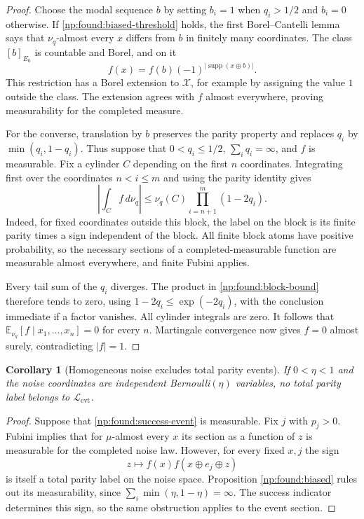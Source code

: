 \documentclass[11pt,a4paper]{article}
\newtheorem{corollary}[theorem]{Corollary}
\theoremstyle{definition}
\theoremstyle{remark}
\newcommand{\E}{\mathbb E}
\newcommand{\cX}{\mathcal X}
\begin{document}
\begin{proof}
Choose the modal sequence $b$ by setting $b_i=1$ when $q_i>1/2$ and
$b_i=0$ otherwise.  If \eqref{np:found:biased-threshold} holds, the first
Borel--Cantelli lemma says that $\nu_q$-almost every $x$ differs from $b$
in finitely many coordinates.  The class $[b]_{E_0}$ is countable and
Borel, and on it
\[
 f(x)=f(b)(-1)^{|\operatorname{supp}(x\oplus b)|}.
\]
This restriction has a Borel extension to $\cX$, for example by assigning
the value $1$ outside the class.  The extension agrees with $f$ almost
everywhere, proving measurability for the completed measure.

For the converse, translation by $b$ preserves the parity property and
replaces $q_i$ by $\min(q_i,1-q_i)$.  Thus suppose that
$0<q_i\le 1/2$, $\sum_i q_i=\infty$, and $f$ is measurable.  Fix a
cylinder $C$ depending on the first $n$ coordinates.  Integrating first
over the coordinates $n<i\le m$ and using the parity identity gives
\begin{equation}
 \left|\int_C f\,d\nu_q\right|
 \le \nu_q(C)\prod_{i=n+1}^{m}(1-2q_i).
 \label{np:found:block-bound}
\end{equation}
Indeed, for fixed coordinates outside this block, the label on the
block is its finite parity times a sign independent of the block.
All finite block atoms have positive probability, so the necessary
sections of a completed-measurable function are measurable almost
everywhere, and finite Fubini applies.

Every tail sum of the $q_i$ diverges.  The product in
\eqref{np:found:block-bound} therefore tends to zero, using
$1-2q_i\le \exp(-2q_i)$, with the conclusion immediate if a factor
vanishes.  All cylinder integrals are zero.  It follows that
$\E_{\nu_q}[f\mid x_1,\ldots,x_n]=0$ for every $n$.
Martingale convergence now gives $f=0$ almost surely, contradicting
$|f|=1$.
\end{proof}

\begin{corollary}[Homogeneous noise excludes total parity events]
\label{np:found:homogeneous-event}
If $0<\eta<1$ and the noise coordinates are independent
Bernoulli$(\eta)$ variables, no total parity label belongs to
$\mathcal L_{\mathrm{evt}}$.
\end{corollary}

\begin{proof}
Suppose that \eqref{np:found:success-event} is measurable.  Fix $j$ with
$p_j>0$.  Fubini implies that for $\mu$-almost every $x$ its section as
a function of $z$ is measurable for the completed noise law.  However,
for every fixed $x,j$ the sign
\[
 z\longmapsto f(x)f(x\oplus e_j\oplus z)
\]
is itself a total parity label on the noise space.  Proposition
\ref{np:found:biased} rules out its measurability, since
$\sum_i\min(\eta,1-\eta)=\infty$.  The success indicator determines
this sign, so the same obstruction applies to the event section.
\end{proof}
\end{document}
